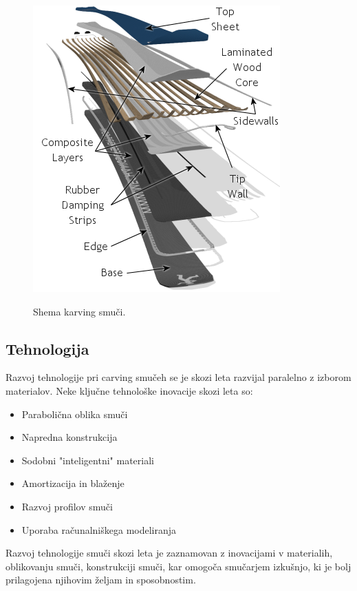 \documentclass{article}
\begin{document}
\begin{figure}
    \centering
    \includegraphics[scale=0.8]{../images/shema karving smuči.png} \\
    \caption[short]{Shema karving smuči.}
\end{figure}

\subsection*{Tehnologija}
Razvoj tehnologije pri carving smučeh se je skozi leta razvijal paralelno z izborom materialov.
Neke ključne tehnološke inovacije skozi leta so:
\begin{itemize}
    \item Parabolična oblika smuči
    \item Napredna konstrukcija
    \item Sodobni "inteligentni" materiali
    \item Amortizacija in blaženje
    \item Razvoj profilov smuči
    \item Uporaba računalniškega modeliranja
\end{itemize}

\*

Razvoj tehnologije smuči skozi leta je zaznamovan z inovacijami v materialih, oblikovanju smuči, konstrukciji smuči, kar omogoča smučarjem izkušnjo, ki je bolj prilagojena njihovim željam in sposobnostim.
\end{document}
